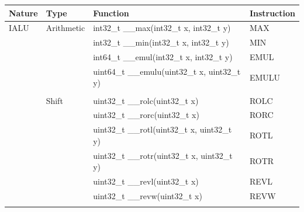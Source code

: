 %
%

\clearpage
\begin{table}
\begin{center}
\scriptsize
\setlength{\tabcolsep}{4pt}
\begin{tabular}{llll}
\hline
Nature            & Type              & Function                                                                     & Instruction              \\ \hline
IALU              & Arithmetic        & int32\_t \_\_max(int32\_t x, int32\_t y)                                     & MAX                      \\
                  &                   & int32\_t \_\_min(int32\_t x, int32\_t y)                                     & MIN                      \\
                  &                   & int64\_t \_\_emul(int32\_t x, int32\_t y)                                    & EMUL                     \\
                  &                   & uint64\_t \_\_emulu(uint32\_t x, uint32\_t y)                                & EMULU                    \\
                  &                   &                                                                              &                          \\
                  & Shift             & uint32\_t \_\_rolc(uint32\_t x)                                              & ROLC                     \\
                  &                   & uint32\_t \_\_rorc(uint32\_t x)                                              & RORC                     \\
                  &                   & uint32\_t \_\_rotl(uint32\_t x, uint32\_t y)                                 & ROTL                     \\
                  &                   & uint32\_t \_\_rotr(uint32\_t x, uint32\_t y)                                 & ROTR                     \\
                  &                   & uint32\_t \_\_revl(uint32\_t x)                                              & REVL                     \\
                  &                   & uint32\_t \_\_revw(uint32\_t x)                                              & REVW                     \\
                  &                   &                                                                              &                          \\

\end{tabular}
\end{center}
\end{table}

